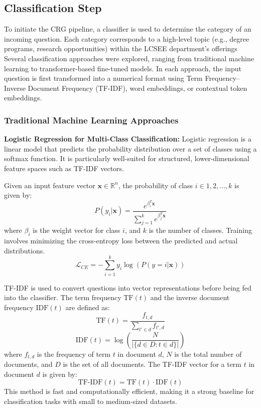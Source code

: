 \documentclass[conference]{IEEEtran}
\begin{document}
\subsection{Classification Step}
To initiate the CRG pipeline, a classifier is used to determine the category of an incoming question. 
Each category corresponds to a high-level topic (e.g., degree programs, research opportunities) within the LCSEE department's offerings
Several classification approaches were explored, ranging from traditional machine learning to transformer-based fine-tuned models. 
In each approach, the input question is first transformed into a numerical format using Term Frequency–Inverse Document Frequency (TF-IDF), word embeddings, or contextual token embeddings.

\subsubsection{Traditional Machine Learning Approaches}
\textbf{Logistic Regression for Multi-Class Classification:}
Logistic regression is a linear model that predicts the probability distribution over a set of classes using a softmax function. 
It is particularly well-suited for structured, lower-dimensional feature spaces such as TF-IDF vectors.

Given an input feature vector $\mathbf{x}\in \mathbb{R}^n$, the probability of class $i\in{1,2,\ldots,k}$ is given by:
\begin{equation}
    P(y_i | \mathbf{x}) = \frac{e^{\beta_i^T \mathbf{x}}}{\sum_{j=1}^{k} e^{\beta_j^T \mathbf{x}}}
\end{equation}
where $\beta_i$ is the weight vector for class $i$, and $k$ is the number of classes.
Training involves minimizing the cross-entropy loss between the predicted and actual distributions.
\begin{equation}
    \mathcal{L}_{CE} = -\sum_{i=1}^{k} y_i \log(P(y=i | \mathbf{x}))
\end{equation}

TF-IDF is used to convert questions into vector representations before being fed into the classifier.
The term frequency $\text{TF}(t)$  and the inverse document frequency $\text{IDF}(t)$ are defined as:
\begin{equation}
    \text{TF}(t) = \frac{f_{t,d}}{\sum_{t' \in d} f_{t',d}}
\end{equation}
\begin{equation}
    \text{IDF}(t) = \log\left(\frac{N}{|\{d \in D: t \in d\}|}\right)
\end{equation}
where $f_{t,d}$ is the frequency of term $t$ in document $d$, $N$ is the total number of documents, and $D$ is the set of all documents.
The TF-IDF vector for a term $t$ in document $d$ is given by:
\begin{equation}
    \text{TF-IDF}(t) = \text{TF}(t) \cdot \text{IDF}(t)
\end{equation}
This method is fast and computationally efficient, making it a strong baseline for classification tasks with small to medium-sized datasets.
\end{document}
